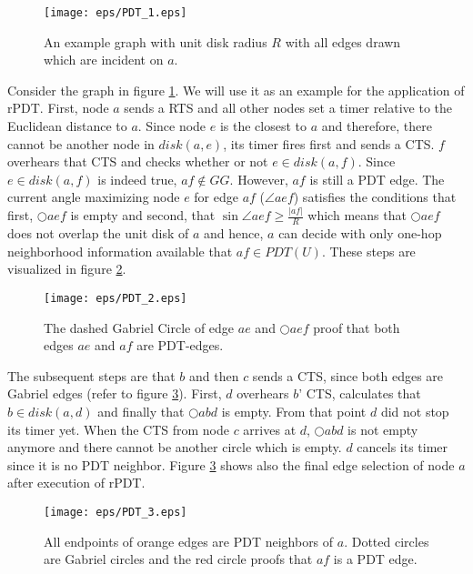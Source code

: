 \begin{figure}[p]
\centering
\texttt{[image: eps/PDT\_1.eps]}
\caption{An example graph with unit disk radius $R $ with all edges drawn which are incident on $a $.}
\label{fig:PDT_1}
\end{figure}
Consider the graph in figure \ref{fig:PDT_1}.
We will use it as an example for the application of rPDT.
First, node $a $ sends a RTS and all other nodes set a timer relative to the Euclidean distance to $a $.
Since node $e $ is the closest to $a $ and therefore, there cannot be another node in $disk(a,e) $, its timer fires first and sends a CTS.
$f $ overhears that CTS and checks whether or not $e \in disk(a,f) $.
Since $e \in disk(a,f) $ is indeed true, $af \notin GG $.
However, $af $ is still a PDT edge.
The current angle maximizing node $e $ for edge $af $ ($\angle{aef} $) satisfies the conditions that first, $\bigcirc{aef} $ is empty and second, that $\sin{\angle{aef}} \geq\frac{|af|}{R} $ which means that $\bigcirc{aef} $ does not overlap the unit disk of $a $ and hence, $a $ can decide with only one-hop neighborhood information available that $af \in PDT(U)$.
These steps are visualized in figure \ref{fig:PDT_2}.
\begin{figure}[p]
\centering
\texttt{[image: eps/PDT\_2.eps]}
\caption{The dashed Gabriel Circle of edge $ae $ and $\bigcirc{aef} $ proof that both edges $ae $ and $af $ are PDT-edges.}
\label{fig:PDT_2}
\end{figure}
The subsequent steps are that $b $ and then $c $ sends a CTS, since both edges are Gabriel edges (refer to figure \ref{fig:PDT_3}).
First, $d $ overhears $b $' CTS, calculates that $b \in disk(a,d) $ and finally that $\bigcirc{abd} $ is empty.
From that point $d $ did not stop its timer yet.
When the CTS from node $c $ arrives at $d $, $\bigcirc{abd} $ is not empty anymore and there cannot be another circle which is empty.
$d $ cancels its timer since it is no PDT neighbor.
Figure \ref{fig:PDT_3} shows also the final edge selection of node $a $ after execution of rPDT.
\begin{figure}[p]
\centering
\texttt{[image: eps/PDT\_3.eps]}
\caption{All endpoints of orange edges are PDT neighbors of $a $. Dotted circles are Gabriel circles and the red circle proofs that $af $ is a PDT edge.}
\label{fig:PDT_3}
\end{figure}